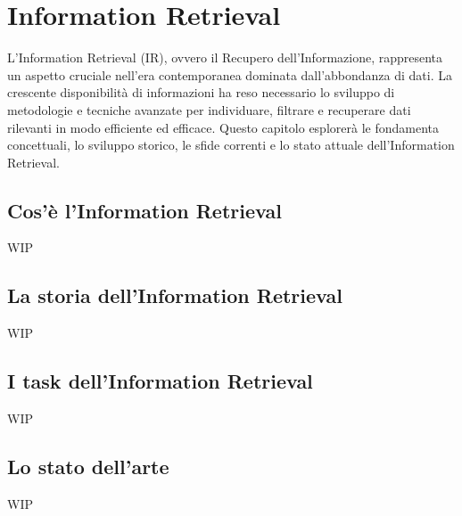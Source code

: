 \chapter{Information Retrieval}\label{Information_Retrieval}
L'Information Retrieval (IR), ovvero il Recupero dell'Informazione, rappresenta un aspetto cruciale nell'era contemporanea dominata dall'abbondanza di dati. La crescente disponibilità di informazioni ha reso necessario lo sviluppo di metodologie e tecniche avanzate per individuare, filtrare e recuperare dati rilevanti in modo efficiente ed efficace. 
Questo capitolo esplorerà le fondamenta concettuali, lo sviluppo storico, le sfide correnti e lo stato attuale dell'Information Retrieval.
\section{Cos'è l'Information Retrieval} WIP

\section{La storia dell'Information Retrieval} WIP
 
\section{I task dell'Information Retrieval} WIP

\section{Lo stato dell'arte} WIP
